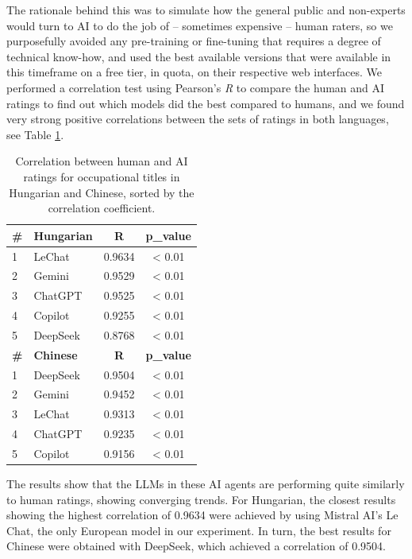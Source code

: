 \documentclass[11pt]{article}
\begin{document}
The rationale behind this was to simulate how the general public and non-experts would turn to AI to do the job of -- sometimes expensive -- human raters, so we purposefully avoided any pre-training or fine-tuning that requires a degree of technical know-how, and used the best available versions that were available in this timeframe on a free tier, in quota, on their respective web interfaces. We performed a correlation test using Pearson's \textit{R} to compare the human and AI ratings to find out which models did the best compared to humans, and we found very strong positive correlations between the sets of ratings in both languages, see Table \ref{tab:correlation}.


\begin{table}
  \caption{Correlation between human and AI ratings for occupational titles in Hungarian and Chinese, sorted by the correlation coefficient.}
  \centering
  \begin{tabular}{@{}l|l|c|c@{}}
    \textbf{\#} & \textbf{Hungarian} & \textbf{R} & \textbf{p\_value} \\
    \hline
    1 & LeChat & 0.9634 & < 0.01 \\
    2 & Gemini & 0.9529 & < 0.01 \\
    3 & ChatGPT & 0.9525 & < 0.01 \\
    4 & Copilot & 0.9255 & < 0.01 \\
    5 & DeepSeek & 0.8768 & < 0.01 \\

    \textbf{\#} & \textbf{Chinese} & \textbf{R} & \textbf{p\_value} \\
    \hline
    1 & DeepSeek & 0.9504 & < 0.01 \\
    2 & Gemini & 0.9452 & < 0.01 \\
    3 & LeChat & 0.9313 & < 0.01 \\
    4 & ChatGPT & 0.9235 & < 0.01 \\
    5 & Copilot & 0.9156 & < 0.01 \\
  \end{tabular}
  \label{tab:correlation}
\vspace{-1em}
\end{table}

The results show that the LLMs in these AI agents are performing quite similarly to human ratings, showing converging trends. For Hungarian, the closest results showing the highest correlation of 0.9634 were achieved by using Mistral AI's Le Chat, the only European model in our experiment. In turn, the best results for Chinese were obtained with DeepSeek, which achieved a correlation of 0.9504.
\end{document}
